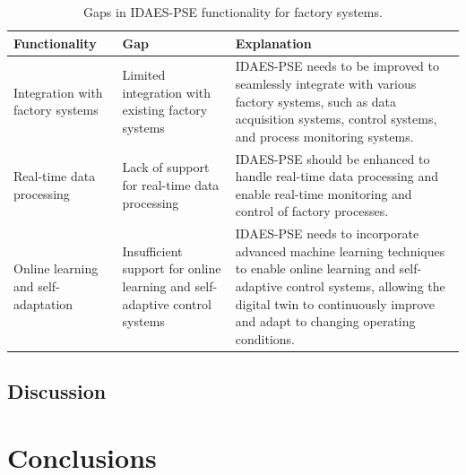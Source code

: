 \documentclass[12pt]{article}
\begin{document}

\begin{table}[h]
    \centering
    \begin{tabular}{|p{3cm}|p{3.5cm}|p{8cm}|}
        \hline
        \textbf{Functionality} & \textbf{Gap} & \textbf{Explanation} \\
        \hline
        Integration with factory systems & 
        Limited integration with existing factory systems & 
        IDAES-PSE needs to be improved to seamlessly integrate with various factory systems, such as data acquisition systems, control systems, and process monitoring systems. \\
        \hline
        Real-time data processing & 
        Lack of support for real-time data processing & 
        IDAES-PSE should be enhanced to handle real-time data processing and enable real-time monitoring and control of factory processes. \\
        \hline
        Online learning and self-adaptation & 
        Insufficient support for online learning and self-adaptive control systems & 
        IDAES-PSE needs to incorporate advanced machine learning techniques to enable online learning and self-adaptive control systems, allowing the digital twin to continuously improve and adapt to changing operating conditions. \\
        \hline
    \end{tabular}
    \caption{Gaps in IDAES-PSE functionality for factory systems.}
    \label{tab:gaps_functionality}
\end{table}


\subsection{Discussion}


\section{Conclusions}
\end{document}
